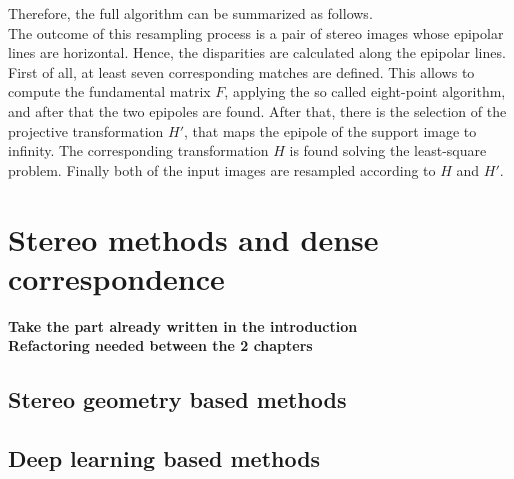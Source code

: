 Therefore, the full algorithm can be summarized as follows.\\
The outcome of this resampling process is a pair of stereo images whose epipolar lines are horizontal.
Hence, the disparities are calculated along the epipolar lines. 
First of all, at least seven corresponding matches are defined.
This allows to compute the fundamental matrix $F$, applying the so called eight-point algorithm, and after that the two epipoles are found.
After that, there is the selection of the projective transformation $H'$, that maps the epipole of the support image to infinity.
The corresponding transformation $H$ is found solving the least-square problem.
Finally both of the input images are resampled according to $H$ and $H'$.

\section{Stereo methods and dense correspondence}
\label{sec:stereometh}

\textbf{Take the part already written in the introduction}\\
\textbf{Refactoring needed between the 2 chapters}

\subsection{Stereo geometry based methods}

\subsection{Deep learning based methods}
\label{subsec:deeplearnmeth}

